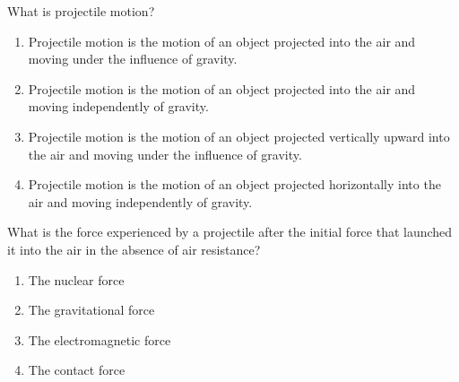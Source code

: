 \documentclass[dvipsnames]{article}
\begin{document}
\begin{exercise}
    What is projectile motion?
    
    \begin{enumerate}[label=\Alph*.]
        \item Projectile motion is the motion of an object projected into the air and moving under the influence of gravity.
        \item Projectile motion is the motion of an object projected into the air and moving independently of gravity.
        \item Projectile motion is the motion of an object projected vertically upward into the air and moving under the influence of gravity.
        \item Projectile motion is the motion of an object projected horizontally into the air and moving independently of gravity.
    \end{enumerate}
\end{exercise}

\begin{exercise}
    What is the force experienced by a projectile after the initial force that launched it into the air in the absence of air resistance?

    \begin{enumerate}[label=\Alph*.]
        \item The nuclear force
        \item The gravitational force
        \item The electromagnetic force
        \item The contact force
    \end{enumerate}
\end{exercise}

    
\end{document}

